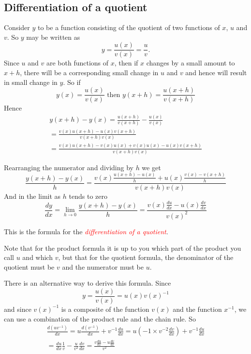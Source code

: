 \documentclass[
  11pt,
  oneside]{book}
\newcommand{\slide}{}
\theoremstyle{definition}
\theoremstyle{definition}
\theoremstyle{definition}
\theoremstyle{definition}
\theoremstyle{remark}
\begin{document}
\slide

\subsection{Differentiation of a quotient}\label{differentiation-of-a-quotient}

Consider \(y\) to be a function consisting of the quotient of two functions of \(x\), \(u\) and \(v\). So \(y\) may be written as
\[
y = \frac{u(x)}{v(x)} = \frac{u}{v}.
\]
Since \(u\) and \(v\) are both functions of \(x\), then if \(x\) changes by a small amount to \(x + h\), there will be a corresponding small change in \(u\) and \(v\) and hence will result in small change in \(y\).
So if
\[
y(x) = \frac{u(x)}{v(x)} \text{ then } y(x+h) = \frac{u(x+h)}{v(x+h)}
\]
Hence
\begin{gather*}
y(x+h)-y(x) = \frac{u(x+h)}{v(x+h)} - \frac{u(x)}{v(x)}\\
=\frac{v(x)u(x+h)-u(x)v(x+h)}{v(x+h)v(x)}\\
=\frac{v(x)u(x+h)-v(x)u(x)+v(x)u(x)-u(x)v(x+h)}{v(x+h)v(x)}
\end{gather*}
\slide
Rearranging the numerator and dividing by \(h\) we get
\[
\frac{y(x+h)-y(x)}{h} = \frac{v(x)\frac{u(x+h)-u(x)}{h}+u(x)\frac{v(x)-v(x+h)}{h}}{v(x+h)v(x)}
\]
And in the limit as \(h\) tends to zero
\[\frac{dy}{dx} = \lim\limits_{h\to0}\frac{y(x+h)-y(x)}{h} = \frac{v(x)\frac{du}{dx} - u(x)\frac{dv}{dx}}{v(x)^2}
\]

This is the formula for the \textcolor{red}{\em differentiation of a quotient}.

Note that for the product formula it is up to you which part of the product you call \(u\) and which \(v\), but that for the quotient formula, the denominator of the quotient must be \(v\) and the numerator must be \(u\).
\slide

There is an alternative way to derive this formula. Since
\[
y = \frac{u(x)}{v(x)} = u(x)v(x)^{-1}
\]
and since \(v(x)^{-1}\) is a composite of the function \(v(x)\) and the function \(x^{-1}\), we can use a combination of the product rule and the chain rule. So
\begin{gather*}
\frac{d(uv^{-1})}{dx} = u\frac{d(v^{-1})}{dx}+v^{-1}\frac{du}{dx} = u\left(-1\times v^{-2}\frac{dv}{dx}\right) + v^{-1}\frac{du}{dx}\\
= \frac{du}{dx}\frac{1}{v} - \frac{u}{v^2}\frac{dv}{dx} = \frac{v\frac{du}{dx}-u\frac{dv}{dx}}{v^2}
\end{gather*}
\slide
\end{document}
